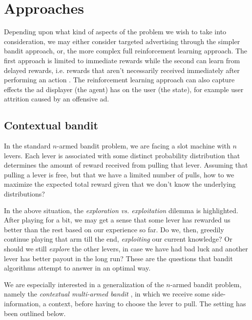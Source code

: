 \documentclass{article} %
\begin{document}


\section{Approaches}

Depending upon what kind of aspects of the problem we wish to take into
consideration, we may either consider targeted advertising through the simpler
bandit approach, or, the more complex full reinforcement learning approach. The
first approach is limited to immediate rewards while the second can learn from
delayed rewards, i.e. rewards that aren't necessarily received immediately
after performing an action \cite{silver2013concurrent}. The reinforcement
learning approach can also capture effects the ad displayer (the agent) has
on the user (the state), for example user attrition caused by an offensive ad.



\subsection{Contextual bandit}

In the standard $n$-armed bandit problem, we are facing a slot machine with $n$
levers. Each lever is associated with some distinct probability distribution
that determines the amount of reward received from pulling that lever. Assuming
that pulling a lever is free, but that we have a limited number of pulls, how
to we maximize the expected total reward given that we don't know the
underlying distributions? \cite{book}

In the above situation, the \emph{exploration vs. exploitation} dilemma is
highlighted. After playing for a bit, we may get a sense that some lever has
rewarded us better than the rest based on our experience so far. Do we, then,
greedily continue playing that arm till the end, \emph{exploiting} our current
knowledge? Or should we still \emph{explore} the other levers, in case we have
had bad luck and another lever has better payout in the long run? These are the
questions that bandit algorithms attempt to answer in an optimal way.

We are especially interested in a generalization of the $n$-armed bandit
problem, namely the \emph{contextual multi-armed bandit}
\cite{langford2007epoch}, in which we receive some side-information, a context,
before having to choose the lever to pull. The setting has been outlined below.
\end{document}
